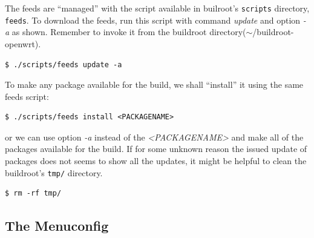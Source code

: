 The feeds are “managed” with the script available in builroot's {\tt scripts} directory, {\tt feeds}.
To download the feeds, run this script with command {\it update} and option {\it -a} as shown.
Remember to invoke it from the buildroot directory($\sim$/buildroot-openwrt).
\begin{lstlisting}[columns=fixed,basicstyle=\ttfamily\footnotesize,tabsize=4,backgroundcolor=\color{yellow!10}]
$ ./scripts/feeds update -a
\end{lstlisting}
To make any package available for the build, we shall “install” it using the same feeds script:
\begin{lstlisting}[columns=fixed,basicstyle=\ttfamily\footnotesize,tabsize=4,backgroundcolor=\color{yellow!10}]
$ ./scripts/feeds install <PACKAGENAME>
\end{lstlisting}
or we can use option {\it -a} instead of the {\it <PACKAGENAME>} and make all of the packages available for the build.
If for some unknown reason the issued update of packages does not seems to show all the updates, it might be helpful to clean the buildroot's {\tt tmp/} directory\cite{feeds}.
\begin{lstlisting}[columns=fixed,basicstyle=\ttfamily\footnotesize,tabsize=4,backgroundcolor=\color{yellow!10}]
$ rm -rf tmp/
\end{lstlisting}

\subsection{The Menuconfig}

